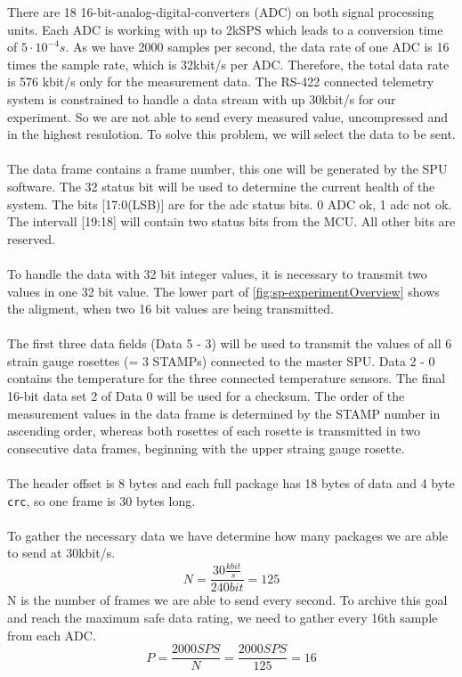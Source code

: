 \noindent There are 18 16-bit-analog-digital-converters (ADC) on both signal processing units. Each ADC is working with up to 2kSPS which leads to a conversion time of $5 \cdot 10^{-4}s$. As we have 2000 samples per second, the data rate of one ADC is 16 times the sample rate, which is 32kbit/s per ADC. Therefore, the total data rate is 576 kbit/s only for the measurement data. The RS-422 connected telemetry system is constrained to handle a data stream with up 30kbit/s for our experiment. So we are not able to send every measured value, uncompressed and in the highest resulotion. To solve this problem, we will select the data to be sent.\\\\
%
The data frame contains a frame number, this one will be generated by the SPU software. The 32 status bit will be used to determine the current health of the system. The bits [17:0(LSB)] are for the adc status bits. 0 ADC ok, 1 adc not ok. The intervall [19:18] will contain two status bits from the MCU. All other bits are reserved.\\\\
%
To handle the data with 32 bit integer values, it is necessary to transmit two values in one 32 bit value. The lower part of \ref{fig:sp-experimentOverview} shows the aligment, when two 16 bit values are being transmitted.\\\\
%
The first three data fields (Data 5 - 3) will be used to transmit the values of all 6 strain gauge rosettes (= 3 STAMPs) connected to the master SPU. Data 2 - 0 contains the temperature for the three connected temperature sensors. The final 16-bit data set 2 of Data 0 will be used for a checksum. The order of the measurement values in the data frame is determined by the STAMP number in ascending order, whereas both rosettes of each rosette is transmitted in two consecutive data frames, beginning with the upper straing gauge rosette.\\\\
%
The header offset is 8 bytes and each full package has 18 bytes of data and 4 byte \texttt{crc}, so one frame is 30 bytes long.\\\\
%
To gather the necessary data we have determine how many packages we are able to send at 30kbit/s. 
$$ N = \frac{30 \frac{kbit}{s}}{240 bit} = 125$$ 
N is the number of frames we are able to send every second. To archive this goal and reach the maximum safe data rating, we need to gather every 16th sample from each ADC. 
$$P = \frac{2000 SPS}{N} = \frac{2000 SPS}{125} = 16 $$
